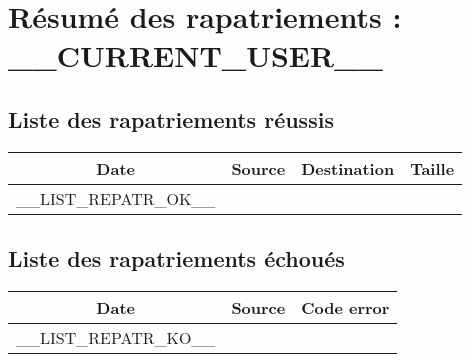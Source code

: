 \newpage


\section{Résumé des rapatriements : __CURRENT_USER__}
  \subsection{Liste des rapatriements réussis}
    \begin{tabular}{|c|c|c|c|}
      \hline
      Date & Source & Destination & Taille \\
      \hline
      __LIST_REPATR_OK__ \\
      \hline
    \end{tabular}

  \subsection{Liste des rapatriements échoués}
    \begin{tabular}{|c|c|c|}
      \hline
      Date & Source & Code error \\
      \hline
      __LIST_REPATR_KO__ \\
      \hline
    \end{tabular}
